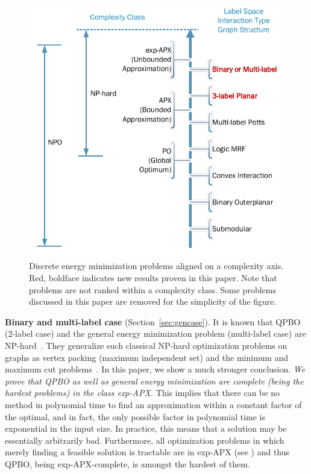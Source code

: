 \begin{figure}
\begin{center}
   \includegraphics[width=0.6\linewidth]{figure/HardnessAxis.pdf}
\end{center}
    \caption{Discrete energy minimization problems aligned on a complexity axis. Red, boldface indicates new results proven in this paper. Note that problems are not ranked within a complexity class. Some problems discussed in this paper are removed for the simplicity of the figure.}
\label{fig:hardnessaxis}
\end{figure}

\textbf{Binary and multi-label case}  (Section~\ref{sec:gencase}). It is known that QPBO (2-label case) and the general energy minimization problem (multi-label case) are NP-hard~\cite{BorosHammer02}. They generalize such classical NP-hard optimization problems on graphs as vertex packing (maximum independent set) and the minimum and maximum cut problems~\cite{Karp-72}.
In this paper, we show a much stronger conclusion. \emph{We prove that QPBO as well as general energy minimization are complete (being the hardest problems) in the class exp-APX.} This implies that there can be no method in polynomial time to find an approximation within a constant factor of the optimal, {\red and in fact, the only possible factor in polynomial time is exponential in the input size}. %
In practice, this means that a solution may be essentially arbitrarily bad.
Furthermore, all optimization problems in which merely finding a feasible solution is tractable are in exp-APX (see ) and thus QPBO, being exp-APX-complete, is amongst the hardest of them.


